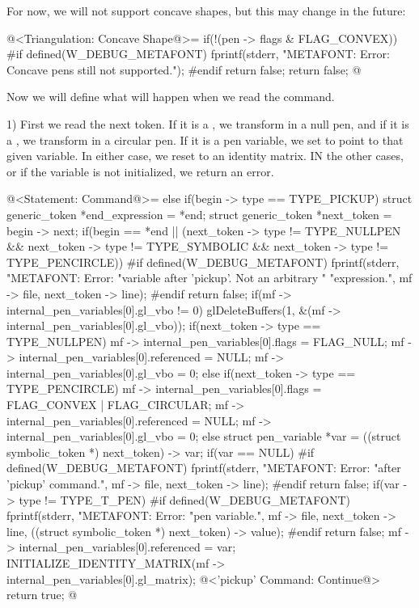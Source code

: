 {{{{{For now, we will not support concave shapes, but this may change in
the future:

\iniciocodigo
@<Triangulation: Concave Shape@>=
if(!(pen -> flags & FLAG_CONVEX)){
#if defined(W_DEBUG_METAFONT)
  fprintf(stderr, "METAFONT: Error: Concave pens still not supported.\n");
#endif
  return false;
}
return false;
@
\fimcodigo


Now we will define what will happen when we read
the  command.

1) First we read the next token. If it is a , we
transform  in a null pen, and if it is
a , we transform in a circular pen. If it is a
pen variable, we set  to point to that given
variable. In either case, we reset  to an
identity matrix. IN the other cases, or if the variable is not
initialized, we return an error.

\iniciocodigo
@<Statement: Command@>=
else if(begin -> type == TYPE_PICKUP){
  struct generic_token *end_expression = *end;
  struct generic_token *next_token = begin -> next;
  if(begin == *end ||
     (next_token -> type != TYPE_NULLPEN &&
      next_token -> type != TYPE_SYMBOLIC &&
      next_token -> type != TYPE_PENCIRCLE)){
#if defined(W_DEBUG_METAFONT)
    fprintf(stderr, "METAFONT: Error: %
                    "variable after 'pickup'. Not an arbitrary "
                    "expression.\n",
            mf -> file, next_token -> line);
#endif
    return false;
  }
  if(mf -> internal_pen_variables[0].gl_vbo != 0)
    glDeleteBuffers(1, &(mf -> internal_pen_variables[0].gl_vbo));
  if(next_token -> type == TYPE_NULLPEN){
    mf -> internal_pen_variables[0].flags = FLAG_NULL;
    mf -> internal_pen_variables[0].referenced = NULL;
    mf -> internal_pen_variables[0].gl_vbo = 0;
  }
  else if(next_token -> type == TYPE_PENCIRCLE){
    mf -> internal_pen_variables[0].flags = FLAG_CONVEX | FLAG_CIRCULAR;
    mf -> internal_pen_variables[0].referenced = NULL;
    mf -> internal_pen_variables[0].gl_vbo = 0;
  }
  else{
    struct pen_variable *var = ((struct symbolic_token *) next_token) -> var;
    if(var == NULL){
#if defined(W_DEBUG_METAFONT)
      fprintf(stderr, "METAFONT: Error: %
                      "after 'pickup' command.\n",
              mf -> file, next_token -> line);
#endif
      return false;
    }
    if(var -> type != TYPE_T_PEN){
#if defined(W_DEBUG_METAFONT)
      fprintf(stderr, "METAFONT: Error: %
                      "pen variable.\n",
              mf -> file, next_token -> line,
              ((struct symbolic_token *) next_token) -> value);
#endif
      return false;
    }
    mf -> internal_pen_variables[0].referenced = var;
  }
  INITIALIZE_IDENTITY_MATRIX(mf -> internal_pen_variables[0].gl_matrix);
  @<'pickup' Command: Continue@>
  return true;
}
@
\fimcodigo

}}}}}
